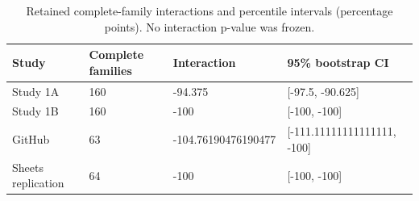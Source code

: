 \begin{table}[t]
\centering
\caption{Retained complete-family interactions and percentile intervals (percentage points). No interaction p-value was frozen.}
\label{tab:s-interactions}
\begin{tabular}{@{}llll@{}}
\toprule
Study & Complete families & Interaction & 95\% bootstrap CI \\
\midrule
Study 1A & 160 & -94.375 & [-97.5, -90.625] \\
Study 1B & 160 & -100 & [-100, -100] \\
GitHub & 63 & -104.76190476190477 & [-111.11111111111111, -100] \\
Sheets replication & 64 & -100 & [-100, -100] \\
\bottomrule
\end{tabular}
\end{table}
